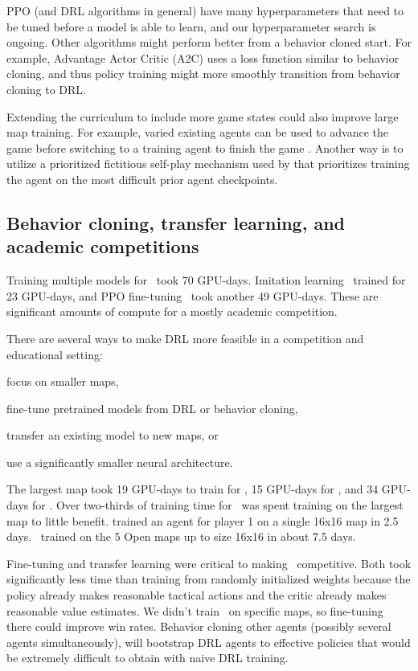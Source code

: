 \documentclass[conference]{IEEEtran}
\begin{document}
PPO (and DRL algorithms in general) have many hyperparameters that need to be tuned
before a model is able to learn, and our hyperparameter search is ongoing. Other 
algorithms might perform better from a behavior cloned start. For example,
Advantage Actor Critic (A2C) \cite{DBLP:conf/icml/MnihBMGLHSK16} uses a loss
function similar to behavior cloning, and thus policy training might more smoothly
transition from behavior cloning to DRL.

Extending the curriculum to include more game states could also improve large map
training. For example, varied existing agents can be used to advance the game before
switching to a training agent to finish the game \cite{DBLP:conf/icml/UchenduX0ZYSBFM23}.
Another way is to utilize a prioritized fictitious self-play mechanism used by
\cite{Vinyals2019GrandmasterLI} that prioritizes training the agent on the
most difficult prior agent checkpoints.

\subsection{Behavior cloning, transfer learning, and academic competitions}
Training multiple models for \agentName\ took 70 GPU-days. Imitation learning \bcAgent\
trained for 23 GPU-days, and PPO fine-tuning \bcPPOAgent\ took another 49 GPU-days. 
These are significant amounts of compute for a mostly academic competition.

There are several ways to make DRL more feasible in a competition and educational setting:
\begin{inparaenum}[(1)]
    \item focus on smaller maps,
    \item fine-tune pretrained models from DRL or behavior cloning,
    \item transfer an existing model to new maps, or
    \item use a significantly smaller neural architecture.
\end{inparaenum}
The largest map took 19 GPU-days to train for \agentName, 15 GPU-days for \bcAgent, and
34 GPU-days for \bcPPOAgent. Over two-thirds of training time for \bcPPOAgent\ was spent
training on the largest map to little benefit. \cite{DBLP:journals/corr/abs-2105-13807}
trained an agent for player 1 on a single 16x16 map in 2.5 days. \bcPPOAgent\ trained
on the 5 Open maps up to size 16x16 in about 7.5 days.

Fine-tuning and transfer learning were critical to making \agentName\ competitive. Both
took significantly less time than training from randomly initialized weights because the
policy already makes reasonable tactical actions and the critic already makes reasonable
value estimates. We didn't train
\bcPPOAgent\ on specific maps, so fine-tuning there could improve win rates. Behavior
cloning other agents (possibly several agents simultaneously), will bootstrap DRL agents
to effective policies that would be extremely difficult to obtain with naive DRL
training.
\end{document}
